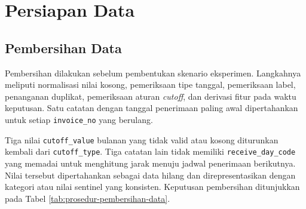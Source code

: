 


\section{Persiapan Data}

\subsection{Pembersihan Data}

Pembersihan dilakukan sebelum pembentukan skenario eksperimen. Langkahnya meliputi normalisasi nilai kosong, pemeriksaan tipe tanggal, pemeriksaan label, penanganan duplikat, pemeriksaan aturan \textit{cutoff}, dan derivasi fitur pada waktu keputusan. Satu catatan dengan tanggal penerimaan paling awal dipertahankan untuk setiap \texttt{invoice\_no} yang berulang.

Tiga nilai \texttt{cutoff\_value} bulanan yang tidak valid atau kosong diturunkan kembali dari \texttt{cutoff\_type}. Tiga catatan lain tidak memiliki \texttt{receive\_day\_code} yang memadai untuk menghitung jarak menuju jadwal penerimaan berikutnya. Nilai tersebut dipertahankan sebagai data hilang dan direpresentasikan dengan kategori atau nilai sentinel yang konsisten. Keputusan pembersihan ditunjukkan pada Tabel \ref{tab:prosedur-pembersihan-data}.

